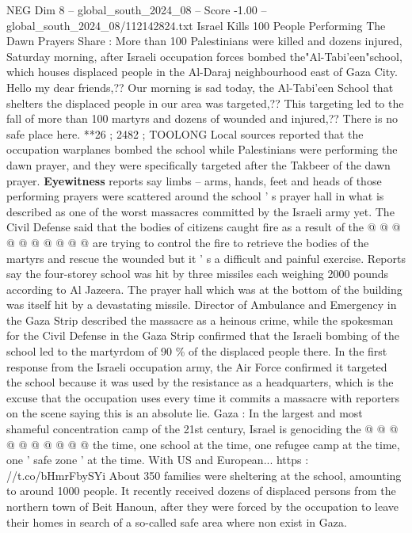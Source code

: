 \begin{textsample}{NEG Dim 8 – global\_south\_2024\_08 – Score -1.00 – global\_south\_2024\_08/112142824.txt}  \label{ex:f8_neg_283}
Israel Kills 100 People Performing The Dawn Prayers Share : More than 100 Palestinians were killed and dozens injured, Saturday morning, after Israeli occupation forces bombed the"Al-Tabi'een"school, which houses displaced people in the Al-Daraj neighbourhood east of Gaza City.
Hello my dear friends,??
Our morning is sad today, the Al-Tabi'een School that shelters the displaced people in our area was targeted,??
This targeting led to the fall of more than 100 martyrs and dozens of wounded and injured,??
There is no safe place here. **26 ; 2482 ; TOOLONG Local sources reported that the occupation warplanes bombed the school while Palestinians were performing the dawn prayer, and they were specifically targeted after the Takbeer of the dawn prayer. \textbf{Eyewitness} reports say limbs -- arms, hands, feet and heads of those performing prayers were scattered around the school ' s prayer hall in what is described as one of the worst massacres committed by the Israeli army yet.
The Civil Defense said that the bodies of citizens caught fire as a result of the @ @ @ @ @ @ @ @ @ @ are trying to control the fire to retrieve the bodies of the martyrs and rescue the wounded but it ' s a difficult and painful exercise.
Reports say the four-storey school was hit by three missiles each weighing 2000 pounds according to Al Jazeera.
The prayer hall which was at the bottom of the building was itself hit by a devastating missile.
Director of Ambulance and Emergency in the Gaza Strip described the massacre as a heinous crime, while the spokesman for the Civil Defense in the Gaza Strip confirmed that the Israeli bombing of the school led to the martyrdom of 90 \% of the displaced people there.
In the first response from the Israeli occupation army, the Air Force confirmed it targeted the school because it was used by the resistance as a headquarters, which is the excuse that the occupation uses every time it commits a massacre with reporters on the scene saying this is an absolute lie.
Gaza : In the largest and most shameful concentration camp of the 21st century, Israel is genociding the @ @ @ @ @ @ @ @ @ @ the time, one school at the time, one refugee camp at the time, one ' safe zone ' at the time.
With US and European... https : //t.co/bHmrFbySYi About 350 families were sheltering at the school, amounting to around 1000 people.
It recently received dozens of displaced persons from the northern town of Beit Hanoun, after they were forced by the occupation to leave their homes in search of a so-called safe area where non exist in Gaza.

\end{textsample}
